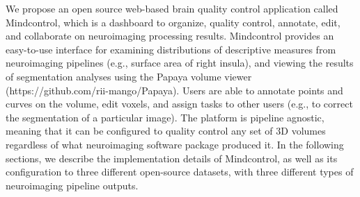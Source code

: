 We propose an open source web-based brain quality control application called Mindcontrol, which is a dashboard to organize, quality control, annotate, edit, and collaborate on neuroimaging processing results. Mindcontrol provides an easy-to-use interface for examining distributions of descriptive measures from neuroimaging pipelines (e.g., surface area of right insula), and viewing the results of segmentation analyses using the Papaya volume viewer (https://github.com/rii-mango/Papaya). Users are able to annotate points and curves on the volume, edit voxels, and assign tasks to other users (e.g., to correct the segmentation of a particular image). The platform is pipeline agnostic, meaning that it can be configured to quality control any set of 3D volumes regardless of what neuroimaging software package produced it. In the following sections, we describe the implementation details of Mindcontrol, as well as its configuration to three different open-source datasets, with three different types of neuroimaging pipeline outputs. 

